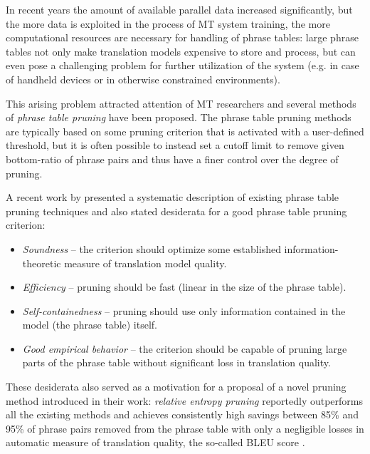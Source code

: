 In recent years the amount of available parallel data increased significantly,
but the more data is exploited in the process of MT system training,
the more computational resources are necessary for handling of phrase tables:
large phrase tables not only make translation models expensive to store and process,
but can even pose a challenging problem for further utilization of the system
(e.g. in case of handheld devices or in otherwise constrained environments).

This arising problem attracted attention of MT researchers and several methods
of \emph{phrase table pruning} have been proposed.
The phrase table pruning methods are typically based on some pruning criterion
that is activated with a user-defined threshold, but it is often possible to instead
set a cutoff limit to remove given bottom-ratio of phrase pairs and thus have a finer
control over the degree of pruning.

A recent work by \citet{zens:systcomp} presented a systematic description of existing
phrase table pruning techniques and also stated desiderata for a good phrase table pruning
criterion:
\begin{itemize}
  \item \emph{Soundness} -- the criterion should optimize some established
    information-theoretic measure of translation model quality.
  \item \emph{Efficiency} -- pruning should be fast (linear in the size of the phrase table).
  \item \emph{Self-containedness} -- pruning should use only information contained in the model
  (the phrase table) itself.
  \item \emph{Good empirical behavior} -- the criterion should be capable of pruning large parts
    of the phrase table without significant loss in translation quality.
\end{itemize}

These desiderata also served as a motivation for a proposal of a novel pruning method introduced
in their work: \emph{relative entropy pruning} reportedly outperforms all the existing methods and 
achieves consistently high savings between 85\% and 95\% of phrase pairs removed from the phrase
table with only a negligible losses in automatic measure of translation quality, the so-called
BLEU score \citep{papineni:bleu}.

